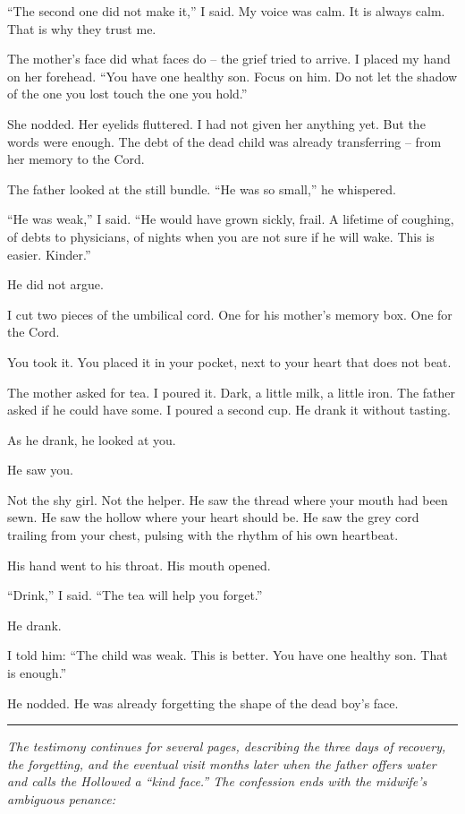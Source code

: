 \documentclass[10pt,twoside]{book}
\begin{document}
“The second one did not make it,” I said. My voice was calm. It is always calm. That is why they trust me.

The mother's face did what faces do – the grief tried to arrive. I placed my hand on her forehead. “You have one healthy son. Focus on him. Do not let the shadow of the one you lost touch the one you hold.”

She nodded. Her eyelids fluttered. I had not given her anything yet. But the words were enough. The debt of the dead child was already transferring – from her memory to the Cord.

The father looked at the still bundle. “He was so small,” he whispered.

“He was weak,” I said. “He would have grown sickly, frail. A lifetime of coughing, of debts to physicians, of nights when you are not sure if he will wake. This is easier. Kinder.”

He did not argue.

I cut two pieces of the umbilical cord. One for his mother's memory box. One for the Cord.

You took it. You placed it in your pocket, next to your heart that does not beat.

The mother asked for tea. I poured it. Dark, a little milk, a little iron. The father asked if he could have some. I poured a second cup. He drank it without tasting.

As he drank, he looked at you.

He saw you.

Not the shy girl. Not the helper. He saw the thread where your mouth had been sewn. He saw the hollow where your heart should be. He saw the grey cord trailing from your chest, pulsing with the rhythm of his own heartbeat.

His hand went to his throat. His mouth opened.

“Drink,” I said. “The tea will help you forget.”

He drank.

I told him: “The child was weak. This is better. You have one healthy son. That is enough.”

He nodded. He was already forgetting the shape of the dead boy's face.

\noindent\rule{\textwidth}{0.5pt}
\small\emph{The testimony continues for several pages, describing the three days of recovery, the forgetting, and the eventual visit months later when the father offers water and calls the Hollowed a “kind face.” The confession ends with the midwife's ambiguous penance:}
\end{document}
